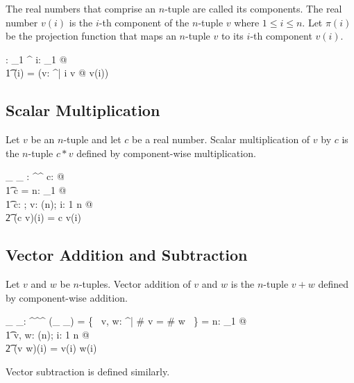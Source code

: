 \documentclass[11pt, oneside]{article}
\newcommand{\R}{{\mathbb{R}}}
\newcommand{\Radd}{\mathbin{+}}
\newcommand{\Rmul}{\mathbin{*}}
\newcommand{\Rinf}{\R^\infty}
\newcommand{\Rtuples}{\R}
\newcommand{\scalarMulRinf}{\mathbin{*}}
\newcommand{\vectorAddRinf}{\mathbin{+}}
\begin{document}
The real numbers that comprise an $n$-tuple are called its components.
The real number $v(i)$ is the $i$-th component of the $n$-tuple $v$ where
$1 \le i \le n$.
Let $\pi(i)$ be the projection function that maps an $n$-tuple $v$ to its $i$-th component $v(i)$.

\begin{axdef}
	\pi: \nat_1 \fun \Rinf \pfun \R
\where
	\forall i: \nat_1 @ \\
	\t1	\pi(i) = (\lambda v: \Rinf | i \in \dom v @ v(i))
\end{axdef}

\subsection{Scalar Multiplication}

Let $v$ be an $n$-tuple and let $c$ be a real number.
Scalar multiplication of $v$ by $c$ is the $n$-tuple $c \scalarMulRinf v$ defined by component-wise multiplication.

\begin{axdef}
	\_ \scalarMulRinf \_ : \R \cross \Rinf \fun \Rinf 
\where
	\forall c: \R @ \\
	\t1	c \scalarMulRinf \langle \rangle = \langle \rangle
\also
	\forall n: \nat_1 @ \\
	\t1	\forall c: \R; v: \Rtuples(n); i: 1 \upto n @ \\
	\t2		(c \scalarMulRinf v)(i) = c \Rmul v(i)
\end{axdef}

\subsection{Vector Addition and Subtraction}

Let $v$ and $w$ be $n$-tuples.
Vector addition of $v$ and $w$ is the $n$-tuple $v \vectorAddRinf w$ defined by component-wise addition.

\begin{axdef}
	\_ \vectorAddRinf \_: \Rinf \cross \Rinf \pfun \Rinf
\where
	\dom(\_ \vectorAddRinf \_) = \{~ v, w: \Rinf | \# v = \# w ~\}
\also
	\langle \rangle \vectorAddRinf \langle \rangle = \langle \rangle
\also
	\forall n: \nat_1 @ \\
	\t1	\forall v, w: \Rtuples(n); i: 1 \upto n @ \\
	\t2		(v \vectorAddRinf w)(i) = v(i) \Radd w(i)
\end{axdef}

Vector subtraction is defined similarly.
\end{document}
